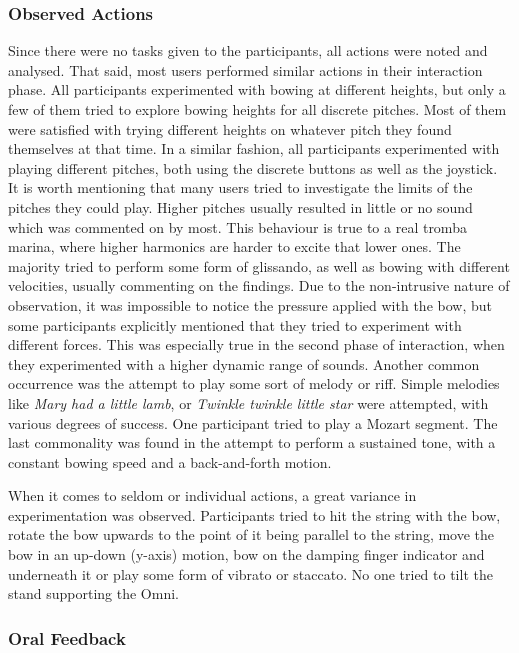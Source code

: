 \documentclass[dvipsnames, pdftex]{article}
\begin{document}
\subsubsection{Observed Actions}
Since there were no tasks given to the participants, all actions were noted and analysed. That said, most users performed similar actions in their interaction phase. All participants experimented with bowing at different heights, but only a few of them tried to explore bowing heights for all discrete pitches. Most of them were satisfied with trying different heights on whatever pitch they found themselves at that time. In a similar fashion, all participants experimented with playing different pitches, both using the discrete buttons as well as the joystick. It is worth mentioning that many users tried to investigate the limits of the pitches they could play. Higher pitches usually resulted in little or no sound which was commented on by most. This behaviour is true to a real tromba marina, where higher harmonics are harder to excite that lower ones. The majority tried to perform some form of glissando, as well as bowing with different velocities, usually commenting on the findings. Due to the non-intrusive nature of observation, it was impossible to notice the pressure applied with the bow, but some participants explicitly mentioned that they tried to experiment with different forces. This was especially true in the second phase of interaction, when they experimented with a higher dynamic range of sounds. Another common occurrence was the attempt to play some sort of melody or riff. Simple melodies like \textit{Mary had a little lamb}, or \textit{Twinkle twinkle little star} were attempted, with various degrees of success. One participant tried to play a Mozart segment. The last commonality was found in the attempt to perform a sustained tone, with a constant bowing speed and a back-and-forth motion.

When it comes to seldom or individual actions, a great variance in experimentation was observed. Participants tried to hit the string with the bow, rotate the bow upwards to the point of it being parallel to the string, move the bow in an up-down (y-axis) motion, bow on the damping finger indicator and underneath it or play some form of vibrato or staccato. No one tried to tilt the stand supporting the Omni.

\subsubsection{Oral Feedback}
\end{document}
